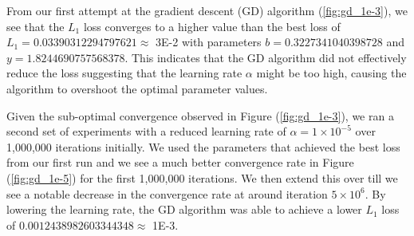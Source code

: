 \documentclass[a4paper]{report}
\begin{document}
From our first attempt at the gradient descent (GD) algorithm (\autoref{fig:gd_1e-3}), we see that the $L_1$ loss converges to a higher value than the best loss of $L_1 = 0.03390312294797621 \approx$ 3E-2 with parameters $b = 0.3227341040398728$ and $y = 1.8244690757568378$. This indicates that the GD algorithm did not effectively reduce the loss suggesting that the learning rate $\alpha$ might be too high, causing the algorithm  to overshoot the optimal parameter values.

Given the sub-optimal convergence observed in Figure (\ref{fig:gd_1e-3}), we ran a second set of experiments with a reduced learning rate of $\alpha = 1 \times 10^{-5}$ over 1,000,000 iterations initially. We used the parameters that achieved the best loss from our first run and we see a much better convergence rate in Figure (\ref{fig:gd_1e-5}) for the first 1,000,000 iterations. We then extend this over till we see a notable decrease in the convergence rate at around iteration $5 \times 10^{6}$. By lowering the learning rate, the GD algorithm was able to achieve a lower $L_1$ loss of $0.0012438982603344348 \approx $ 1E-3.
\end{document}
